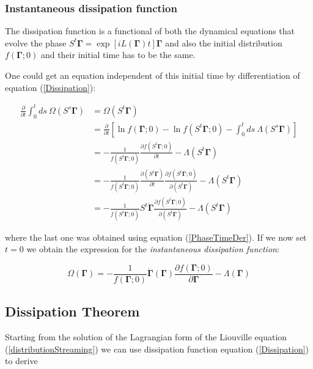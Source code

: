 \documentclass[a4paper,12pt]{article}
\begin{document}

\subsubsection{Instantaneous dissipation function}

The dissipation function is a functional of both the dynamical equations that evolve the phase $S^t \bm{\Gamma} = \exp[iL(\bm{\Gamma})t]\bm{\Gamma}$ and also the initial distribution $f(\bm{\Gamma};0)$ and their initial time has to be the same.

One could get an equation independent of this initial time by differentiation of equation (\ref{Dissipation}):

\begin{equation}
\begin{aligned}
  \frac{\partial}{\partial t}\int_0^t ds\ \Omega(S^s  \bm{\Gamma}) &= \Omega(S^t \bm{\Gamma})\\
  &=\frac{\partial}{\partial t}[\ln{f(\bm{\Gamma};0)}-\ln{f(S^t\bm{\Gamma};0)}
-\int_0^t ds \ \Lambda(S^s \bm{\Gamma})
]\\
&=-\frac{1}{f(S^t\bm{\Gamma};0)}\frac{\partial f(S^t\bm{\Gamma};0)}{\partial t}-\Lambda(S^t \bm{\Gamma})\\
&=-\frac{1}{f(S^t\bm{\Gamma};0)}\frac{\partial( S^t \bm{\Gamma})}{\partial t}\frac{\partial f(S^t\bm{\Gamma};0)}{\partial(S^t \bm{\Gamma})}-\Lambda(S^t \bm{\Gamma})\\
&=-\frac{1}{f(S^t\bm{\Gamma};0)}S^t\dot{\bm{\Gamma}}
\frac{\partial f(S^t\bm{\Gamma};0)}{\partial(S^t \bm{\Gamma})}-\Lambda(S^t \bm{\Gamma})
\end{aligned}
\end{equation}

where the last one was obtained using equation (\ref{PhaseTimeDer}). 
If we now set $t=0$ we obtain the expression for the \textit{instantaneous dissipation function}:

\begin{equation}
  \Omega(\bm{\Gamma})=-\frac{1}{f(\bm{\Gamma};0)}\dot{\bm{\Gamma}}(\bm{\Gamma})\frac{\partial{f(\bm{\Gamma};0)}}{\partial{\bm{\Gamma}}}-\Lambda(\bm{\Gamma})
\end{equation}

\subsection{Dissipation Theorem}

Starting from the solution of the Lagrangian form of the Liouville equation (\ref{distributionStreaming}) we can use dissipation function equation (\ref{Dissipation}) to derive
\end{document}
